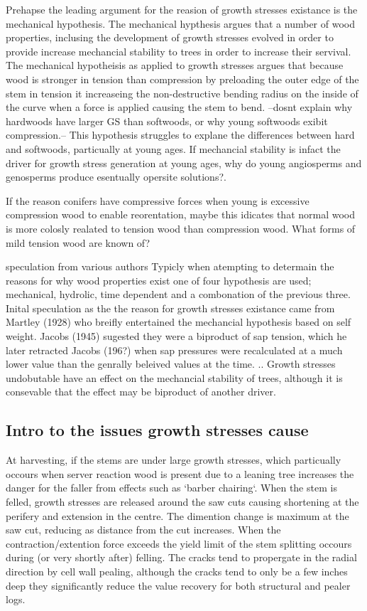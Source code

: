 \documentclass{article}
\begin{document}
Prehapse the leading argument for the reasion of growth stresses existance is
the mechanical hypothesis. The mechanical hypthesis argues that a number of wood properties,
inclusing the development of growth stresses evolved in order to provide
increase mechancial stability to trees in order to increase their servival. The
mechanical hypotheisis as applied to growth stresses argues that because wood is
stronger in tension than compression by preloading the outer edge of the stem
in tension it increaseing the non-destructive bending radius on the inside of
the curve when a force is applied causing the stem to bend. --dosnt explain why
hardwoods have larger GS than softwoods, or why young softwoods exibit
compression.-- This hypothesis struggles to explane the differences between hard
and softwoods, particually at young ages. If mechancial stability is infact the
driver for growth stress generation at young ages, why do young angiosperms and
genosperms produce esentually opersite solutions?.

If the reason conifers have compressive forces when young is excessive
compression wood to enable reorentation, maybe this idicates that normal wood is
more colosly realated to tension wood than compression wood. What forms of mild
tension wood are known of?

speculation from various authors
Typicly when atempting to determain the reasons for why wood properties exist
one of four hypothesis are used; mechanical, hydrolic, time dependent and a
combonation of the previous three. Inital speculation as the the reason for
growth stresses existance came from Martley (1928) who breifly entertained the
mechancial hypothesis based on self weight. Jacobs (1945) sugested they were a
biproduct of sap tension, which he later retracted Jacobs (196?) when sap
pressures were recalculated at a much lower value than the genrally beleived
values at the time. .. Growth stresses undobutable have an effect on the
mechancial stability of trees, although it is consevable that the effect may be
biproduct of another driver.


\subsection{Intro to the issues growth stresses cause }

At harvesting, if the stems are under large growth stresses, which particually
occours when server reaction wood is present due to a leaning tree
increases the danger for the faller from effects such as `barber chairing`. When
the stem is felled, growth stresses are released around the saw cuts causing
shortening at the perifery and extension in the centre. The dimention change is
maximum at the saw cut, reducing as distance from the cut increases. When
the contraction/extention force exceeds the yield limit of the stem
splitting occours during (or very shortly after) felling. The cracks tend to
propergate in the radial direction by cell wall pealing, although the cracks
tend to only be a few inches deep they significantly reduce the value recovery
for both structural and pealer logs.
\end{document}

